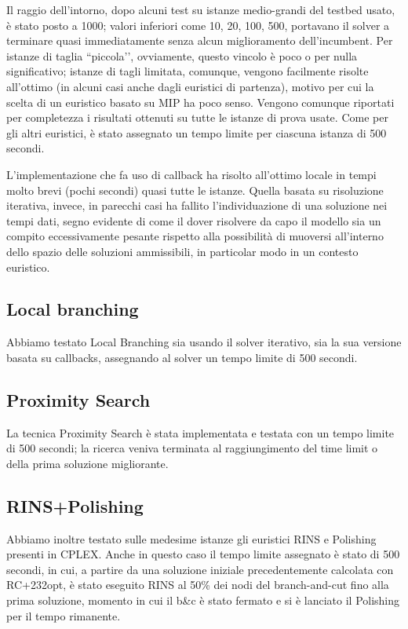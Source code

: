Il raggio dell’intorno, dopo alcuni test su istanze medio-grandi del testbed usato, è stato posto a 1000; valori inferiori come 10, 20, 100, 500, portavano il solver a terminare quasi immediatamente senza alcun miglioramento dell’incumbent. Per istanze di taglia ``piccola’’, ovviamente, questo vincolo è poco o per nulla significativo; istanze di tagli limitata, comunque, vengono facilmente risolte all’ottimo (in alcuni casi anche dagli euristici di partenza), motivo per cui la scelta di un euristico basato su MIP ha poco senso. Vengono comunque riportati per completezza i risultati ottenuti su tutte le istanze di prova usate. Come per gli altri euristici, è stato assegnato un tempo limite per ciascuna istanza di 500 secondi.

L’implementazione che fa uso di callback ha risolto all’ottimo locale in tempi molto brevi (pochi secondi) quasi tutte le istanze. Quella basata su risoluzione iterativa, invece, in parecchi casi ha fallito l’individuazione di una soluzione nei tempi dati, segno evidente di come il dover risolvere da capo il modello sia un compito eccessivamente pesante rispetto alla possibilità di muoversi all’interno dello spazio delle soluzioni ammissibili, in particolar modo in un contesto euristico.

\subsection{Local branching}
Abbiamo testato Local Branching sia usando il solver iterativo, sia la sua versione basata su callbacks, assegnando al solver un tempo limite di 500 secondi.

\subsection{Proximity Search}
La tecnica Proximity Search è stata implementata e testata con un tempo limite di 500 secondi; la ricerca veniva terminata al raggiungimento del time limit o della prima soluzione migliorante.

\subsection{RINS+Polishing}
Abbiamo inoltre testato sulle medesime istanze gli euristici RINS e Polishing presenti in CPLEX. Anche in questo caso il tempo limite assegnato è stato di 500 secondi, in cui, a partire da una soluzione iniziale precedentemente calcolata con RC+232opt, è stato eseguito RINS al 50\% dei nodi del branch-and-cut fino alla prima soluzione, momento in cui il b\&c è stato fermato e si è lanciato il Polishing per il tempo rimanente.


